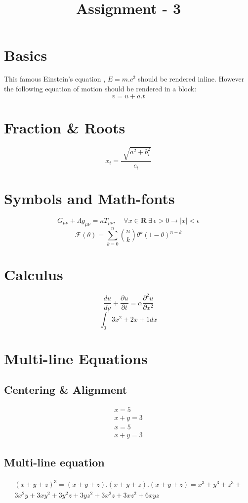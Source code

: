 \documentclass[12pt]{article}
\begin{document}
	\title{\textbf{Assignment - 3}}
	\maketitle
	
	
	\section{Basics}
	This famous Einstein's equation , $E=m.c^{2}$ should be rendered inline.
	However the following equation of motion should be rendered in a block:
	\[
	v=u+a.t
	\]
	\section{Fraction \& Roots}
	\[
	x_{i}= \frac{\sqrt[]{a^2 + b_i^2}}{c_i}
	\]
	\section{Symbols and Math-fonts}
	\[
		G_{\mu\nu}+\Lambda g_{\mu\nu} = \kappa T_{\mu\nu}, \quad \forall x\in\mathbf{R}
		\:\exists\:\epsilon>0\rightarrow|x|<\epsilon
	\]
	\[
		\mathcal{F}(\theta)=\sum_{k=0}^{n}\binom{n}{k} \theta ^{k}(1- \theta )^{n-k}
	\]
	\section{Calculus}
	\[
		\frac{du}{dv}+\frac{\partial u}{\partial t}=\alpha\frac{\partial^{2}u}{\partial x^{2}}
	\]
	\[
		\int_{0}^{1}{3x^{2}+2x+1}dx
	\]
	\newpage
	\section{Multi-line Equations}
	
	\subsection{Centering \& Alignment}
	\begin{gather}
		x=5 \\
		x+y=3
	\end{gather}
	\begin{align}
		x=5 \\
		x+y=3
	\end{align}
	
	\subsection{Multi-line equation}
	\begin{multline}
		(x+y+z)^{3} = (x+y+z).(x+y+z).(x+y+z) = x^{3}+y^{3}+z^{3}+ \\
		3x^{2}y+3xy^{2}+3y^{2}z+3yz^{2}+3x^{2}z+3xz^{2}+6xyz
	\end{multline}
	
\end{document}
